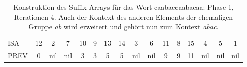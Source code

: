 \begin{table}[H]
\begin{adjustbox}{max width=\textwidth}
\begin{tabular}{lccccccccccccccc}
\multicolumn{1}{l|}{ISA}     & 12                      & 2   & 7   & 10 & 9                       & 13                                                & 14                         & 3                         & 6                        & 11 & 8                         & 15  & 4   & 5   & 1   \\
\multicolumn{1}{l|}{PREV}    & 0                       & nil & nil & 3  & 3                       & 5                                                 & 5                          & nil                       & nil                      & 9  & \cellcolor[HTML]{\red}9 & 11  & nil & nil & nil
\end{tabular}
\end{adjustbox}

\caption[Konstruktion des Suffix Arrays für das Wort caabaccaabacaa: Phase 1, Iterationen 4]{Konstruktion des Suffix Arrays für das Wort caabaccaabacaa: Phase 1, Iterationen 4. Auch der Kontext des anderen Elements der ehemaligen Gruppe \textit{ab} wird erweitert und gehört nun zum Kontext \textit{abac}.}
\label{table_complex_example_1_4} 
\end{table}

